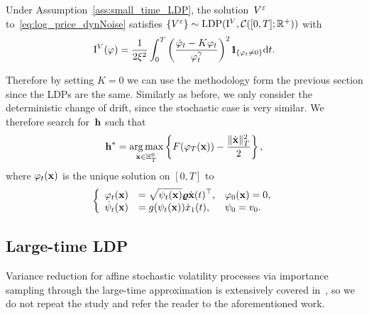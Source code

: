 \begin{theorem}\label{thm:Conforti}
Under Assumption~\ref{ass:small_time_LDP}, 
the solution~$V^\varepsilon$ to~\eqref{eq:log_price_dynNoise}
satisfies $\left\{V^{\varepsilon}\right\}\sim\mathrm{LDP}(\mathrm{I}^{V}, \mathcal{C}([0, T]; \mathbb{R}^{+}))$ with
$$
\IIV(\varphi)=\frac{1}{2 \xi^{2}} \int_{0}^{T}\left(\frac{\dot{\varphi}_{t} - K\varphi_{t}}{\varphi_{t}^{\gamma}}\right)^{2} \ind_{\left\{\varphi_{t} \neq 0\right\}} \D t.
$$
\end{theorem}
Therefore by setting $K=0$ we can use the methodology form the previous section since the LDPs are the same. Similarly as before, we only consider the deterministic change of drift, since the stochastic case is very similar.
We therefore search for~$\boldsymbol{\mathrm{h}}$ such that
$$
\boldsymbol{\mathrm{h}}^* = \operatorname*{arg\,max}\limits_{\boldsymbol{\mathrm{x}}\in \mathbb{H}_T^0} 
\left\{F(\varphi_T(\boldsymbol{\mathrm{x}})) - \frac{\|\dot{\boldsymbol{\mathrm{x}}}\|_{T}^2}{2}\right\},
$$
where $\varphi_t(\boldsymbol{\mathrm{x}})$ is the unique solution on $[0,T]$ to
\begin{equation*}
\left\{
\begin{array}{rll}
\varphi_t(\boldsymbol{\mathrm{x}}) & = \displaystyle \sqrt{\psi_t(\boldsymbol{\mathrm{x}})}\boldsymbol{\mathrm{\varrho}} \dot{\boldsymbol{\mathrm{x}}}(t)^\top, & \varphi_0(\boldsymbol{\mathrm{x}}) = 0,\\
\dot{\psi}_t(\boldsymbol{\mathrm{x}}) & =  \displaystyle g(\psi_t(\boldsymbol{\mathrm{x}})) \dot{x}_1(t), & \psi_0 = v_0.
\end{array}
\right.
\end{equation*}



\subsection{Large-time LDP}
Variance reduction for affine stochastic volatility processes via importance sampling through the large-time approximation is extensively covered in~\cite{Grbac2021Long-TimeModels}, so we do not repeat the study and refer the reader to the aforementioned work.



